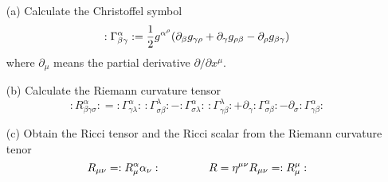 \begin{itemize}

\item[(a)] Calculate the Christoffel symbol
\begin{equation}
\label{christoffel_symbol}
:\Gamma ^\alpha _{\beta \gamma}: = 
\dfrac{1}{2} g^{\alpha ^\rho} \qty(
\partial_\beta g_{\gamma \rho} + 
\partial_\gamma g_{\rho \beta} -
\partial_\rho g_{\beta \gamma}
)
\end{equation}
where $\partial_\mu$ means the partial derivative $\partial/\partial x^{\mu}$.
\item[(b)] Calculate the Riemann curvature tensor
\begin{equation}
\label{riemann_tensor}
: R^\alpha _{\beta \gamma \sigma}:
=
:\Gamma ^\alpha _{\gamma \lambda}:\,
:\Gamma ^\lambda _{\sigma \beta}:
-
:\Gamma ^\alpha _{\sigma \lambda}:\,
:\Gamma ^\lambda _{\gamma \beta}:
+
\partial_\gamma :\Gamma^\alpha _{\sigma \beta}: 
-
\partial_\sigma :\Gamma^\alpha _{\gamma \beta} :
\end{equation}

\item[(c)] Obtain the Ricci tensor and the Ricci scalar from the Riemann curvature tenor
\begin{equation}
\label{ricci}
R_{\mu \nu} = :R^\alpha _\mu \alpha _\nu: \hspace{1.5cm}
R=\eta^{\mu \nu} R_{\mu \nu} = :R^{\mu} _\mu:
\end{equation}

\end{itemize}

